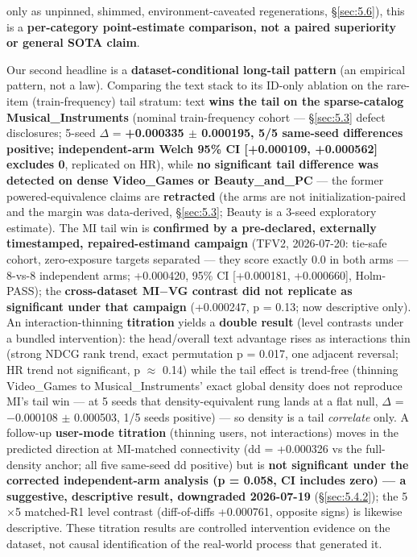 only as unpinned, shimmed, environment-caveated regenerations, \S\ref{sec:5.6}), this is a \textbf{per-category point-estimate comparison, not a paired superiority or general SOTA claim}.

Our second headline is a \textbf{dataset-conditional long-tail pattern} (an empirical pattern, not a law). Comparing the text stack to its ID-only ablation on the rare-item (train-frequency) tail stratum: text \textbf{wins the tail on the sparse-catalog Musical\_Instruments} (nominal train-frequency cohort --- \S\ref{sec:5.3} defect disclosures; 5-seed \ensuremath{\Delta} = \textbf{+0.000335 \ensuremath{\pm} 0.000195, 5/5 same-seed differences positive; independent-arm Welch 95\% CI {[}+0.000109, +0.000562{]} excludes 0}, replicated on HR), while \textbf{no significant tail difference was detected on dense Video\_Games or Beauty\_and\_PC} --- the former powered-equivalence claims are \textbf{retracted} (the arms are not initialization-paired and the margin was data-derived, \S\ref{sec:5.3}; Beauty is a 3-seed exploratory estimate). The MI tail win is \textbf{confirmed by a pre-declared, externally timestamped, repaired-estimand campaign} (TFV2, 2026-07-20: tie-safe cohort, zero-exposure targets separated --- they score exactly 0.0 in both arms --- 8-vs-8 independent arms; +0.000420, 95\% CI {[}+0.000181, +0.000660{]}, Holm-PASS); the \textbf{cross-dataset MI\ensuremath{-}VG contrast did not replicate as significant under that campaign} (+0.000247, p = 0.13; now descriptive only). An interaction-thinning \textbf{titration} yields a \textbf{double result} (level contrasts under a bundled intervention): the head/overall text advantage rises as interactions thin (strong NDCG rank trend, exact permutation p = 0.017, one adjacent reversal; HR trend not significant, p \ensuremath{\approx} 0.14) while the tail effect is trend-free (thinning Video\_Games to Musical\_Instruments' exact global density does not reproduce MI's tail win --- at 5 seeds that density-equivalent rung lands at a flat null, \ensuremath{\Delta} = \ensuremath{-}0.000108 \ensuremath{\pm} 0.000503, 1/5 seeds positive) --- so density is a tail \emph{correlate} only. A follow-up \textbf{user-mode titration} (thinning users, not interactions) moves in the predicted direction at MI-matched connectivity (dd = +0.000326 vs the full-density anchor; all five same-seed dd positive) but is \textbf{not significant under the corrected independent-arm analysis (p = 0.058, CI includes zero) --- a suggestive, descriptive result, downgraded 2026-07-19} (\S\ref{sec:5.4.2}); the 5\ensuremath{\times}5 matched-R1 level contrast (diff-of-diffs +0.000761, opposite signs) is likewise descriptive. These titration results are controlled intervention evidence on the dataset, not causal identification of the real-world process that generated it.

